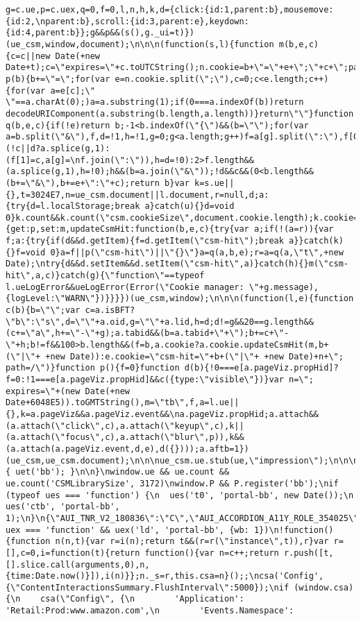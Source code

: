\documentclass[
]{article}
\begin{document}
\begin{verbatim}
g=c.ue,p=c.uex,q=0,f=0,l,n,h,k,d={click:{id:1,parent:b},mousemove:{id:2,\nparent:b},scroll:{id:3,parent:e},keydown:{id:4,parent:b}};g&&p&&(s(),g._ui=t)})(ue_csm,window,document);\n\n\n(function(s,l){function m(b,e,c){c=c||new Date(+new Date+t);c=\"expires=\"+c.toUTCString();n.cookie=b+\"=\"+e+\";\"+c+\";path=/\"}function p(b){b+=\"=\";for(var e=n.cookie.split(\";\"),c=0;c<e.length;c++){for(var a=e[c];\" \"==a.charAt(0);)a=a.substring(1);if(0===a.indexOf(b))return decodeURIComponent(a.substring(b.length,a.length))}return\"\"}function q(b,e,c){if(!e)return b;-1<b.indexOf(\"{\")&&(b=\"\");for(var a=b.split(\"&\"),f,d=!1,h=!1,g=0;g<a.length;g++)f=a[g].split(\":\"),f[0]==e?(!c||d?a.splice(g,1):(f[1]=c,a[g]=\nf.join(\":\")),h=d=!0):2>f.length&&(a.splice(g,1),h=!0);h&&(b=a.join(\"&\"));!d&&c&&(0<b.length&&(b+=\"&\"),b+=e+\":\"+c);return b}var k=s.ue||{},t=3024E7,n=ue_csm.document||l.document,r=null,d;a:{try{d=l.localStorage;break a}catch(u){}d=void 0}k.count&&k.count(\"csm.cookieSize\",document.cookie.length);k.cookie={get:p,set:m,updateCsmHit:function(b,e,c){try{var a;if(!(a=r)){var f;a:{try{if(d&&d.getItem){f=d.getItem(\"csm-hit\");break a}}catch(k){}f=void 0}a=f||p(\"csm-hit\")||\"{}\"}a=q(a,b,e);r=a=q(a,\"t\",+new Date);\ntry{d&&d.setItem&&d.setItem(\"csm-hit\",a)}catch(h){}m(\"csm-hit\",a,c)}catch(g){\"function\"==typeof l.ueLogError&&ueLogError(Error(\"Cookie manager: \"+g.message),{logLevel:\"WARN\"})}}}})(ue_csm,window);\n\n\n(function(l,e){function c(b){b=\"\";var c=a.isBFT?\"b\":\"s\",d=\"\"+a.oid,g=\"\"+a.lid,h=d;d!=g&&20==g.length&&(c+=\"a\",h+=\"-\"+g);a.tabid&&(b=a.tabid+\"+\");b+=c+\"-\"+h;b!=f&&100>b.length&&(f=b,a.cookie?a.cookie.updateCsmHit(m,b+(\"|\"+ +new Date)):e.cookie=\"csm-hit=\"+b+(\"|\"+ +new Date)+n+\"; path=/\")}function p(){f=0}function d(b){!0===e[a.pageViz.propHid]?f=0:!1===e[a.pageViz.propHid]&&c({type:\"visible\"})}var n=\"; expires=\"+(new Date(+new Date+6048E5)).toGMTString(),m=\"tb\",f,a=l.ue||{},k=a.pageViz&&a.pageViz.event&&\na.pageViz.propHid;a.attach&&(a.attach(\"click\",c),a.attach(\"keyup\",c),k||(a.attach(\"focus\",c),a.attach(\"blur\",p)),k&&(a.attach(a.pageViz.event,d,e),d({})));a.aftb=1})(ue_csm,ue_csm.document);\n\n\nue_csm.ue.stub(ue,\"impression\");\n\n\nue.stub(ue,\"trigger\");\n\n\nif(window.ue&&uet) { uet('bb'); }\n\n}\nwindow.ue && ue.count && ue.count('CSMLibrarySize', 3172)\nwindow.P && P.register('bb');\nif (typeof ues === 'function') {\n  ues('t0', 'portal-bb', new Date());\n  ues('ctb', 'portal-bb', 1);\n}\n{\"AUI_TNR_V2_180836\":\"C\",\"AUI_ACCORDION_A11Y_ROLE_354025\":\"C\",\"AUI_PRELOAD_261698\":\"C\",\"AUI_LAUNCH_2021_ALLY_FIXES_392482\":\"T1\",\"AUI_TEMPLATE_WEBLAB_CACHE_333406\":\"C\",\"AUI_72554\":\"C\",\"AUI_KILLSWITCH_CSA_LOGGER_372963\":\"C\",\"AUI_REL_NOREFERRER_NOOPENER_309527\":\"C\",\"AUI_PCI_RISK_BANNER_210084\":\"C\"}typeof uex === 'function' && uex('ld', 'portal-bb', {wb: 1})\n!function(){function n(n,t){var r=i(n);return t&&(r=r(\"instance\",t)),r}var r=[],c=0,i=function(t){return function(){var n=c++;return r.push([t,[].slice.call(arguments,0),n,{time:Date.now()}]),i(n)}};n._s=r,this.csa=n}();;\ncsa('Config', {\"ContentInteractionsSummary.FlushInterval\":5000});\nif (window.csa) {\n    csa(\"Config\", {\n        'Application': 'Retail:Prod:www.amazon.com',\n        'Events.Namespace': 
\end{verbatim}
\end{document}
